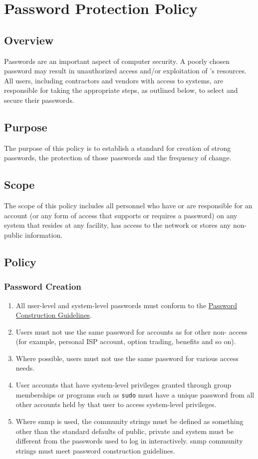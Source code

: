 \chapter{Password Protection Policy}\label{G:PPP}
\CommonIntroduction
\section{Overview}
Passwords are an important aspect of computer security.  
A poorly chosen password may result in unauthorized access and/or exploitation of \CompanyName{}'s resources.  
All users, including contractors and vendors with access to \CompanyName{} systems, are responsible for taking the appropriate steps, as outlined below, to select and secure their passwords.
\section{Purpose}
The purpose of this policy is to establish a standard for creation of strong passwords, the protection of those passwords\oxford{} and the frequency of change.
\section{Scope}
The scope of this policy includes all personnel who have or are responsible for an account (or any form of access that supports or requires a password) on any system that resides at any \CompanyName{} facility, has access to the \CompanyName{} network\oxford{} or stores any non-public \CompanyName{} information.
\section{Policy}
\subsection{Password Creation}
\begin{enumerate}
\item
All user-level and system-level passwords must conform to the \hyperref[G:PCG]{Password Construction Guidelines}.%
\item
Users must not use the same password for \CompanyName{} accounts as for other non-\CompanyName{} access (for example, personal ISP account, option trading, benefits\oxford{} and so on).
\item
Where possible, users must not use the same password for various \CompanyName{} access needs.
\item
User accounts that have system-level privileges granted through group memberships or programs such as \texttt{sudo} must have a unique password from all other accounts held by that user to access system-level privileges.
\item
Where \gls{snmp} is used, the community strings must be defined as something other than the standard defaults of public, private\oxford{} and system  must be different from the passwords used to log in interactively.  
\gls{snmp} community strings must meet password construction guidelines.
\end{enumerate}
